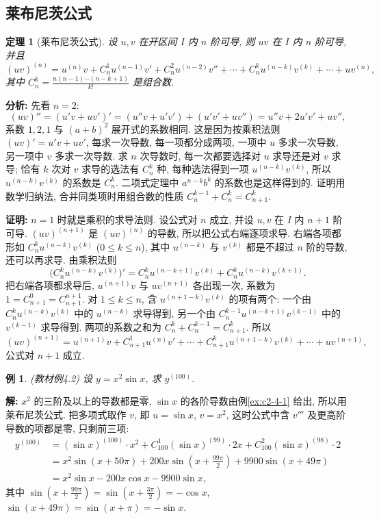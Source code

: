 \documentclass[UTF8,openany]{ctexbook}
\theoremstyle{chinesetextbook}
\newtheorem{example}{例}[section]
\newenvironment{cnproof}{\par\indent\textbf{证明:} \ignorespaces}{\par}
\newenvironment{cnsolution}{\par\indent\textbf{解:} \ignorespaces}{\par}
\newtheorem*{theoremsingle}{定理}
\begin{document}
\subsection{莱布尼茨公式}
\begin{theoremsingle}[莱布尼茨公式]
设 $u,v$ 在开区间 $I$ 内 $n$ 阶可导, 则 $uv$ 在 $I$ 内 $n$ 阶可导, 并且
\[
(uv)^{(n)}=u^{(n)}v+C_n^1u^{(n-1)}v'+C_n^2u^{(n-2)}v''+\cdots+C_n^ku^{(n-k)}v^{(k)}+\cdots+uv^{(n)},
\]
其中 $\displaystyle C_n^k=\frac{n(n-1)\cdots(n-k+1)}{k!}$ 是组合数.
\end{theoremsingle}
\par\indent\textbf{分析:} 先看 $n=2$:
\[
(uv)''=(u'v+uv')'=(u''v+u'v')+(u'v'+uv'')=u''v+2u'v'+uv'',
\]
系数 $1,2,1$ 与 $(a+b)^2$ 展开式的系数相同. 这是因为按乘积法则 $(uv)'=u'v+uv'$, 每求一次导数, 每一项都分成两项, 一项中 $u$ 多求一次导数, 另一项中 $v$ 多求一次导数. 求 $n$ 次导数时, 每一次都要选择对 $u$ 求导还是对 $v$ 求导; 恰有 $k$ 次对 $v$ 求导的选法有 $C_n^k$ 种, 每种选法得到一项 $u^{(n-k)}v^{(k)}$, 所以 $u^{(n-k)}v^{(k)}$ 的系数是 $C_n^k$. 二项式定理中 $a^{n-k}b^k$ 的系数也是这样得到的. 证明用数学归纳法, 合并同类项时用组合数的性质 $C_n^{k-1}+C_n^k=C_{n+1}^k$.
\begin{cnproof}
$n=1$ 时就是乘积的求导法则. 设公式对 $n$ 成立, 并设 $u,v$ 在 $I$ 内 $n+1$ 阶可导. $(uv)^{(n+1)}$ 是 $(uv)^{(n)}$ 的导数, 所以把公式右端逐项求导. 右端各项都形如 $C_n^ku^{(n-k)}v^{(k)}$ ($0\le k\le n$), 其中 $u^{(n-k)}$ 与 $v^{(k)}$ 都是不超过 $n$ 阶的导数, 还可以再求导. 由乘积法则
\[
\bigl(C_n^ku^{(n-k)}v^{(k)}\bigr)'=C_n^ku^{(n-k+1)}v^{(k)}+C_n^ku^{(n-k)}v^{(k+1)}.
\]
把右端各项都求导后, $u^{(n+1)}v$ 与 $uv^{(n+1)}$ 各出现一次, 系数为 $1=C_{n+1}^0=C_{n+1}^{n+1}$. 对 $1\le k\le n$, 含 $u^{(n+1-k)}v^{(k)}$ 的项有两个: 一个由 $C_n^ku^{(n-k)}v^{(k)}$ 中的 $u^{(n-k)}$ 求导得到, 另一个由 $C_n^{k-1}u^{(n-k+1)}v^{(k-1)}$ 中的 $v^{(k-1)}$ 求导得到. 两项的系数之和为 $C_n^k+C_n^{k-1}=C_{n+1}^k$. 所以
\[
(uv)^{(n+1)}=u^{(n+1)}v+C_{n+1}^1u^{(n)}v'+\cdots+C_{n+1}^ku^{(n+1-k)}v^{(k)}+\cdots+uv^{(n+1)},
\]
公式对 $n+1$ 成立.
\end{cnproof}
\begin{example}\label{ex:c2-4-2}
\textnormal{(教材例4.2)} 设 $y=x^2\sin x$, 求 $y^{(100)}$.
\end{example}
\begin{cnsolution}
$x^2$ 的三阶及以上的导数都是零, $\sin x$ 的各阶导数由例\ref{ex:c2-4-1} 给出, 所以用莱布尼茨公式. 把多项式取作 $v$, 即 $u=\sin x$, $v=x^2$, 这时公式中含 $v'''$ 及更高阶导数的项都是零, 只剩前三项:
\[
\begin{aligned}
y^{(100)}&=(\sin x)^{(100)}\cdot x^2+C_{100}^1(\sin x)^{(99)}\cdot2x+C_{100}^2(\sin x)^{(98)}\cdot2\\
&=x^2\sin(x+50\pi)+200x\sin\left(x+\frac{99\pi}2\right)+9900\sin(x+49\pi)\\
&=x^2\sin x-200x\cos x-9900\sin x,
\end{aligned}
\]
其中 $\displaystyle\sin\left(x+\frac{99\pi}2\right)=\sin\left(x+\frac{3\pi}2\right)=-\cos x$, $\sin(x+49\pi)=\sin(x+\pi)=-\sin x$.
\end{cnsolution}
\end{document}
